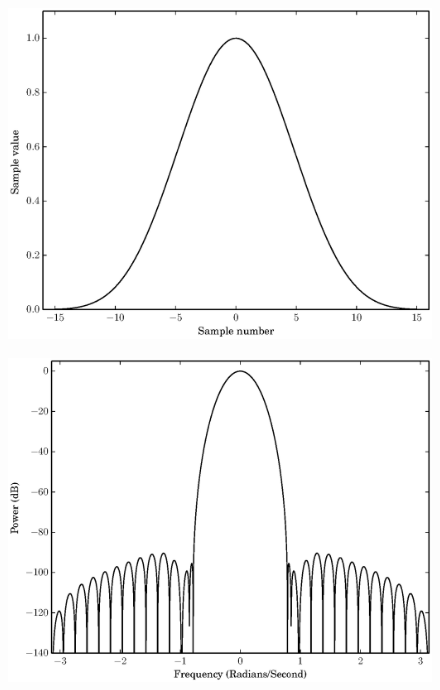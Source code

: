 \begin{figure}[!t]
    \caption{}
    \centering
    \includegraphics[width=\figwidthscale\textwidth]{plots/c1_blackman_td.eps}
    \CaptionWithTitle{%
    }{}
\end{figure}

\begin{figure}[!t]
    \caption{}
    \centering
    \includegraphics[width=\figwidthscale\textwidth]{plots/c1_blackman_fd.eps}
    \CaptionWithTitle{%
    }{}
\end{figure}

